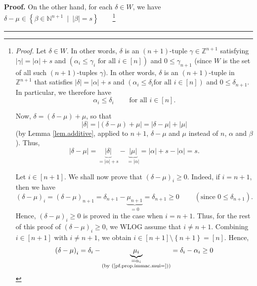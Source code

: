 \documentclass
[numbers=enddot,12pt,final,onecolumn,notitlepage,english]{scrartcl}%
\theoremstyle{definition}
\newenvironment{proof}[1][Proof]{\noindent\textbf{#1.} }{\ \rule{0.5em}{0.5em}}
\newenvironment{verlong}{}{}
\begin{document}
\begin{proof}
\begin{verlong}
On the other hand, for each $\delta\in W$, we have $\delta-\mu\in\left\{
\beta\in\mathbb{N}^{n+1}\ \mid\ \left\vert \beta\right\vert =s\right\}
$\ \ \ \ \footnote{\textit{Proof.} Let $\delta\in W$. In other words, $\delta$
is an $\left(  n+1\right)  $-tuple $\gamma\in\mathbb{Z}^{n+1}$ satisfying
$\left\vert \gamma\right\vert =\left\vert \alpha\right\vert +s$ and $\left(
\alpha_{i}\leq\gamma_{i}\text{ for all }i\in\left[  n\right]  \right)  $ and
$0\leq\gamma_{n+1}$ (since $W$ is the set of all such $\left(  n+1\right)
$-tuples $\gamma$). In other words, $\delta$ is an $\left(  n+1\right)
$-tuple in $\mathbb{Z}^{n+1}$ that satisfies $\left\vert \delta\right\vert
=\left\vert \alpha\right\vert +s$ and $\left(  \alpha_{i}\leq\delta_{i}\text{
for all }i\in\left[  n\right]  \right)  $ and $0\leq\delta_{n+1}$. In
particular, we therefore have%
\begin{equation}
\alpha_{i}\leq\delta_{i}\ \ \ \ \ \ \ \ \ \ \text{for all }i\in\left[
n\right]  . \label{pf.prop.immac.fn5.pf.1}%
\end{equation}
\par
Now, $\delta=\left(  \delta-\mu\right)  +\mu$, so that%
\[
\left\vert \delta\right\vert =\left\vert \left(  \delta-\mu\right)
+\mu\right\vert =\left\vert \delta-\mu\right\vert +\left\vert \mu\right\vert
\]
(by Lemma \ref{lem.additive}, applied to $n+1$, $\delta-\mu$ and $\mu$ instead
of $n$, $\alpha$ and $\beta$). Thus,%
\[
\left\vert \delta-\mu\right\vert =\underbrace{\left\vert \delta\right\vert
}_{=\left\vert \alpha\right\vert +s}-\underbrace{\left\vert \mu\right\vert
}_{=\left\vert \alpha\right\vert }=\left\vert \alpha\right\vert +s-\left\vert
\alpha\right\vert =s.
\]
\par
Let $i\in\left[  n+1\right]  $. We shall now prove that $\left(  \delta
-\mu\right)  _{i}\geq0$. Indeed, if $i=n+1$, then we have%
\[
\left(  \delta-\mu\right)  _{i}=\left(  \delta-\mu\right)  _{n+1}=\delta
_{n+1}-\underbrace{\mu_{n+1}}_{=0}=\delta_{n+1}\geq
0\ \ \ \ \ \ \ \ \ \ \left(  \text{since }0\leq\delta_{n+1}\right)  .
\]
Hence, $\left(  \delta-\mu\right)  _{i}\geq0$ is proved in the case when
$i=n+1$. Thus, for the rest of this proof of $\left(  \delta-\mu\right)
_{i}\geq0$, we WLOG assume that $i\neq n+1$. Combining $i\in\left[
n+1\right]  $ with $i\neq n+1$, we obtain $i\in\left[  n+1\right]
\setminus\left\{  n+1\right\}  =\left[  n\right]  $. Hence,%
\[
\left(  \delta-\mu\right)  _{i}=\delta_{i}-\underbrace{\mu_{i}}%
_{\substack{=\alpha_{i}\\\text{(by (\ref{pf.prop.immac.mui=}))}}}=\delta
_{i}-\alpha_{i}\geq0
\]}
\end{verlong}
\end{proof}
\end{document}
